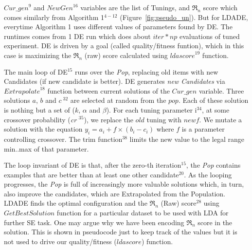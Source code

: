\documentclass[twocolumn,5p,sort&compress]{elsarticle}
\newcommand{\fig}[1]{Figure~\ref{fig:#1}}
\theoremstyle{break}
\begin{document}


$\mathit{Cur\_gen}^{9}$ and $\mathit{NewGen}^{16}$ variables are the list of Tunings, and $\Re_n$ score 
which comes similarly from Algorithm 1$^{4-12}$ (\fig{pseudo_un}). But for LDADE, everytime Algorithm 1 uses different values of parameters found by DE. The runtimes comes from 1 DE run which does about $\mathit{iter} * np$ evaluations of tuned experiment. DE is driven by a goal (called quality/fitness funtion), which in this case is maximizing the $\Re_n$ (raw) score calculated using  $\mathit{ldascore}^{19}$ function.

The main loop of DE$^{15}$ runs over the \textit{Pop}, replacing old items with new Candidates (if new candidate is better).
DE generates \textit{new Candidates} via 
$\mathit{Extrapolate}^{18}$ function between current solutions of the $\mathit{Cur\_gen}$ variable. Three solutions $a$, $b$ and $c\ ^{32}$ are
selected at random from the $\mathit{pop}$. Each of these solution is nothing but a set of ($k$, $\alpha$ and $\beta$). For each tuning parameter i$^{34}$, at some crossover probability (\textit{cr} $^{35}$), we
replace the $\mathit{old}$ tuning with $\mathit{newf}$. We mutate a solution with the equation $y_i = a_i + f \times (b_i - c_i)$ where $f$ is a
parameter controlling crossover. The trim function$^{38}$ limits the new value
to the legal range min..max of that parameter.

The loop invariant of DE is that, after the zero-th iteration$^{15}$, the \textit{Pop}
contains examples that are better than at least one other candidate$^{20}$.
As the looping progresses, the \textit{Pop} is full of increasingly more valuable solutions
which, in turn, also improve the candidates, which are Extrapolated from the Population. LDADE finds the optimal configuration and the $\Re_n$ (Raw) score$^{28}$ using $GetBestSolution$ function for a particular dataset to be used with LDA for further SE task. One may argue why we have been encoding $\Re_n$ score in the solution. This is shown in pseudocode just to keep track of the values but it is not used to drive our quality/fitness ($ldascore$) function.
\end{document}
